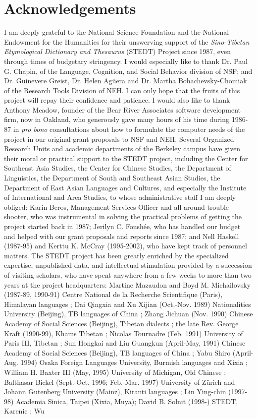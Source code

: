 \documentclass[12pt]{article}
\begin{document}
\doublespacing

\section{Acknowledgements}
I am deeply grateful to the National Science Foundation and the National Endowment for the Humanities for their unswerving support of the {\it Sino-Tibetan Etymological Dictionary and Thesaurus} (STEDT) Project since 1987, even through times of budgetary stringency. I would especially like to thank Dr. Paul G. Chapin, of the Language, Cognition, and Social Behavior division of NSF; and Dr. Guinevere Greist, Dr. Helen Ag\"uera and Dr. Martha Bohachevsky-Chomiak of the Research Tools Division of NEH. I can only hope that the fruits of this project will repay their confidence and patience. I would also like to thank Anthony Meadow, founder of the Bear River Associates software development firm, now in Oakland, who generously gave many hours of his time during 1986-87 in {\it pro bono} consultations about how to formulate the computer needs of the project in our original grant proposals to NSF and NEH. Several Organized Research Units and academic departments of the Berkeley campus have given their moral or practical support to the STEDT project, including the Center for Southeast Asia Studies, the Center for Chinese Studies, the Department of Linguistics, the Department of South and Southeast Asian Studies, the Department of East Asian Languages and Cultures, and especially the Institute of International and Area Studies, to whose administrative staff I am deeply obliged: Karin Beros, Management Services Officer and all-around trouble-shooter, who was instrumental in solving the practical problems of getting the project started back in 1987; Jerilyn C. Foush\'ee, who has handled our budget and helped with our grant proposals and reports since 1987; and Nell Haskell (1987-95) and Kerttu K. McCray (1995-2002), who have kept track of personnel matters. The STEDT project has been greatly enriched by the specialized expertise, unpublished data, and intellectual stimulation provided by a succession of visiting scholars, who have spent anywhere from a few weeks to more than two years at the project headquarters: Martine Mazaudon and Boyd M. Michailovsky (1987-89, 1990-91) Centre National de la Recherche Scientifique (Paris), Himalayan languages ; {\sc Dai} Qingxia and {\sc Xu} Xijian (Oct.-Nov. 1989) Nationalities University (Beijing), TB languages of China ; {\sc Zhang} Jichuan (Nov. 1990) Chinese Academy of Social Sciences (Beijing), Tibetan dialects ; the late Rev. George Kraft (1990-99), Khams Tibetan ; Nicolas Tournadre (Feb. 1991) University of Paris III, Tibetan ; {\sc Sun} Hongkai and {\sc Liu} Guangkun (April-May, 1991) Chinese Academy of Social Sciences (Beijing), TB languages of China ; {\sc Yabu} Shiro (April-Aug. 1994) Osaka Foreign Languages University, Burmish languages and Xixia ; William H. Baxter III (May, 1995) University of Michigan, Old Chinese ; Balthasar Bickel (Sept.-Oct. 1996; Feb.-Mar. 1997) University of Z\"urich and Johann Gutenberg University (Mainz), Kiranti languages ; {\sc Lin} Ying-chin (1997-98) Academia Sinica, Taipei (Xixia, Muya); David B. Solnit (1998-) STEDT, Karenic ; {\sc Wu} 
\end{document}
